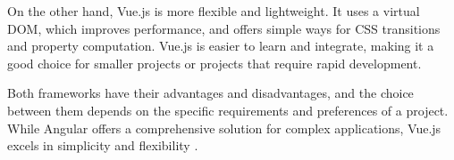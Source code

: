 On the other hand, Vue.js is more flexible and lightweight. It uses a virtual DOM, which improves performance, and offers simple ways for CSS transitions and property computation. Vue.js is easier to learn and integrate, making it a good choice for smaller projects or projects that require rapid development.

Both frameworks have their advantages and disadvantages, and the choice between them depends on the specific requirements and preferences of a project. While Angular offers a comprehensive solution for complex applications, Vue.js excels in simplicity and flexibility \cite{kinsta}.


